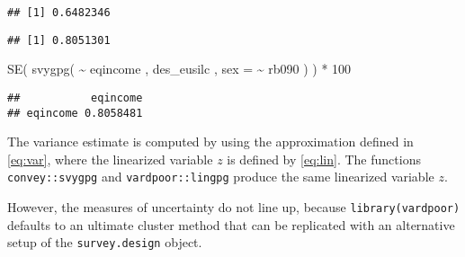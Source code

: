\documentclass[
]{book}
\newenvironment{Shaded}{\begin{snugshade}}{\end{snugshade}}
\newcommand{\AttributeTok}[1]{\textcolor[rgb]{0.77,0.63,0.00}{#1}}
\newcommand{\CommentTok}[1]{\textcolor[rgb]{0.56,0.35,0.01}{\textit{#1}}}
\newcommand{\DecValTok}[1]{\textcolor[rgb]{0.00,0.00,0.81}{#1}}
\newcommand{\FunctionTok}[1]{\textcolor[rgb]{0.00,0.00,0.00}{#1}}
\newcommand{\NormalTok}[1]{#1}
\newcommand{\SpecialCharTok}[1]{\textcolor[rgb]{0.00,0.00,0.00}{#1}}
\begin{document}
\begin{verbatim}
## [1] 0.6482346
\end{verbatim}

\begin{Shaded}
\end{Shaded}

\begin{verbatim}
## [1] 0.8051301
\end{verbatim}

\begin{Shaded}
\begin{Highlighting}[]
\FunctionTok{SE}\NormalTok{( }\FunctionTok{svygpg}\NormalTok{( }\SpecialCharTok{\textasciitilde{}}\NormalTok{ eqincome , des\_eusilc , }\AttributeTok{sex =} \SpecialCharTok{\textasciitilde{}}\NormalTok{ rb090 ) ) }\SpecialCharTok{*} \DecValTok{100}
\end{Highlighting}
\end{Shaded}

\begin{verbatim}
##           eqincome
## eqincome 0.8058481
\end{verbatim}

The variance estimate is computed by using the approximation defined in \eqref{eq:var}, where the linearized variable \(z\) is defined by \eqref{eq:lin}. The functions \texttt{convey::svygpg} and \texttt{vardpoor::lingpg} produce the same linearized variable \(z\).

However, the measures of uncertainty do not line up, because \texttt{library(vardpoor)} defaults to an ultimate cluster method that can be replicated with an alternative setup of the \texttt{survey.design} object.
\end{document}
